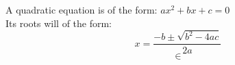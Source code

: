 \documentclass[11pt]{article}
\begin{document}
A quadratic equation is of the form: $ax^2+bx+c=0$\\[6pt]
Its roots will of the form:\\
$$x = \frac{-b\pm\sqrt{b^2-4ac}}{2a}$$
$$\in$$
\end{document}
